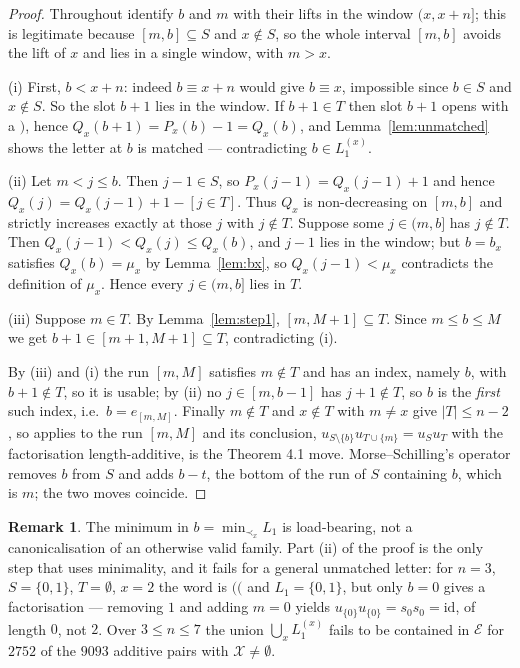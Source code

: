 \documentclass[11pt]{article}
\theoremstyle{definition}
\newtheorem{rem}[thm]{Remark}
\newcommand{\XX}{\mathcal{X}}
\newcommand{\EE}{\mathcal{E}}
\begin{document}
\begin{proof}
Throughout identify $b$ and $m$ with their lifts in the window $(x,x+n]$; this is legitimate
because $[m,b]\subseteq S$ and $x\notin S$, so the whole interval $[m,b]$ avoids the lift of
$x$ and lies in a single window, with $m>x$.

(i) First, $b<x+n$: indeed $b\equiv x+n$ would give $b\equiv x$, impossible since $b\in S$ and
$x\notin S$. So the slot $b+1$ lies in the window. If $b+1\in T$ then slot $b+1$ opens with a
$\texttt{)}$, hence $Q_x(b+1)=P_x(b)-1=Q_x(b)$, and Lemma~\ref{lem:unmatched} shows the letter
at $b$ is matched --- contradicting $b\in L_1^{(x)}$.

(ii) Let $m<j\le b$. Then $j-1\in S$, so $P_x(j-1)=Q_x(j-1)+1$ and hence
$Q_x(j)=Q_x(j-1)+1-[j\in T]$. Thus $Q_x$ is non-decreasing on $[m,b]$ and strictly increases
exactly at those $j$ with $j\notin T$. Suppose some $j\in(m,b]$ has $j\notin T$. Then
$Q_x(j-1)<Q_x(j)\le Q_x(b)$, and $j-1$ lies in the window; but $b=b_x$ satisfies
$Q_x(b)=\mu_x$ by Lemma~\ref{lem:bx}, so $Q_x(j-1)<\mu_x$ contradicts the definition of
$\mu_x$. Hence every $j\in(m,b]$ lies in $T$.

(iii) Suppose $m\in T$. By Lemma~\ref{lem:step1}, $[m,M+1]\subseteq T$. Since $m\le b\le M$ we
get $b+1\in[m+1,M+1]\subseteq T$, contradicting (i).

By (iii) and (i) the run $[m,M]$ satisfies $m\notin T$ and has an index, namely $b$, with
$b+1\notin T$, so it is usable; by (ii) no $j\in[m,b-1]$ has $j+1\notin T$, so $b$ is the
\emph{first} such index, i.e.\ $b=e_{[m,M]}$. Finally $m\notin T$ and $x\notin T$ with $m\ne x$
give $|T|\le n-2$, so \cite[Lem.~4.3]{Clio2} applies to the run $[m,M]$ and its conclusion,
$u_{S\setminus\{b\}}u_{T\cup\{m\}}=u_Su_T$ with the factorisation length-additive, is the
Theorem 4.1 move. Morse--Schilling's operator removes $b$ from $S$ and adds $b-t$, the bottom
of the run of $S$ containing $b$, which is $m$; the two moves coincide.
\end{proof}

\begin{rem}\label{rem:minmatters}
The minimum in $b=\min_{\prec_x}L_1$ is load-bearing, not a canonicalisation of an otherwise
valid family. Part (ii) of the proof is the only step that uses minimality, and it fails for a
general unmatched letter: for $n=3$, $S=\{0,1\}$, $T=\emptyset$, $x=2$ the word is
$\texttt{((}$ and $L_1=\{0,1\}$, but only $b=0$ gives a factorisation --- removing $1$ and
adding $m=0$ yields $u_{\{0\}}u_{\{0\}}=s_0s_0=\mathrm{id}$, of length $0$, not $2$. Over
$3\le n\le7$ the union $\bigcup_x L_1^{(x)}$ fails to be contained in $\EE$ for $2752$ of the
$9093$ additive pairs with $\XX\ne\emptyset$.
\end{rem}
\end{document}
